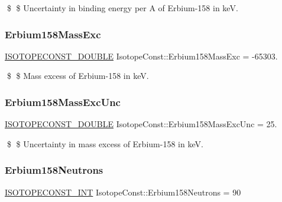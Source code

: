 \$ \$ Uncertainty in binding energy per A of Erbium-\/158 in keV. \mbox{\label{group___isotope_const-_erbium-_er158_ga60a7378bb4e8f3b3cfd04b65c27bd95c}} 
\subsubsection{\texorpdfstring{Erbium158\+Mass\+Exc}{Erbium158MassExc}}
{\footnotesize\ttfamily \mbox{\hyperlink{group___isotope_const-_macros_ga8f45a7272ce02c0b4c65c44636ed719a}{I\+S\+O\+T\+O\+P\+E\+C\+O\+N\+S\+T\+\_\+\+D\+O\+U\+B\+LE}} Isotope\+Const\+::\+Erbium158\+Mass\+Exc = -\/65303.}

\$ \$ Mass excess of Erbium-\/158 in keV. \mbox{\label{group___isotope_const-_erbium-_er158_ga0d9028557e60ef91e77c4d10d47c8676}} 
\subsubsection{\texorpdfstring{Erbium158\+Mass\+Exc\+Unc}{Erbium158MassExcUnc}}
{\footnotesize\ttfamily \mbox{\hyperlink{group___isotope_const-_macros_ga8f45a7272ce02c0b4c65c44636ed719a}{I\+S\+O\+T\+O\+P\+E\+C\+O\+N\+S\+T\+\_\+\+D\+O\+U\+B\+LE}} Isotope\+Const\+::\+Erbium158\+Mass\+Exc\+Unc = 25.}

\$ \$ Uncertainty in mass excess of Erbium-\/158 in keV. \mbox{\label{group___isotope_const-_erbium-_er158_gae25a0a5f07132a375a7ae91a2b6edc1a}} 
\subsubsection{\texorpdfstring{Erbium158\+Neutrons}{Erbium158Neutrons}}
{\footnotesize\ttfamily \mbox{\hyperlink{group___isotope_const-_macros_ga5f18360b3e99483a35c32d789e62621c}{I\+S\+O\+T\+O\+P\+E\+C\+O\+N\+S\+T\+\_\+\+I\+NT}} Isotope\+Const\+::\+Erbium158\+Neutrons = 90}

